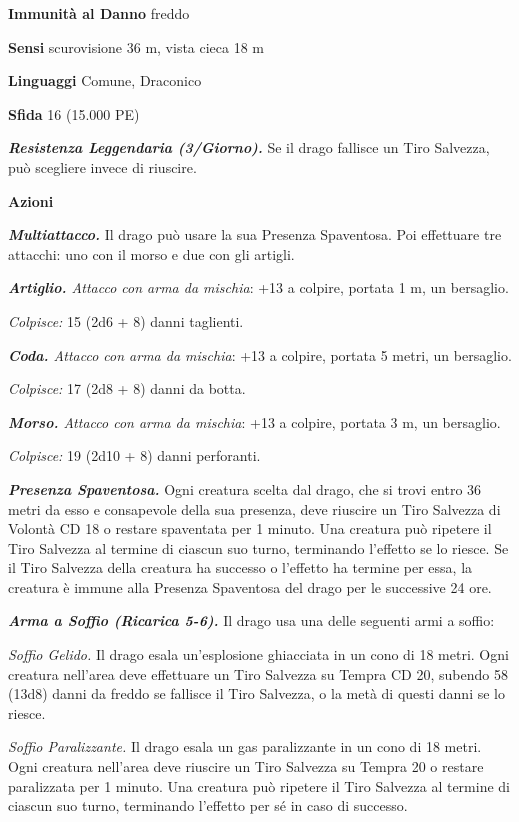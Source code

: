 \begin{multicols}{2}
\textbf{Immunità al Danno} freddo

\textbf{Sensi} scurovisione 36 m, vista cieca 18 m 

\textbf{Linguaggi} Comune, Draconico

\textbf{Sfida} 16 (15.000 PE)

\emph{\textbf{Resistenza Leggendaria (3/Giorno).}} Se il drago fallisce un Tiro Salvezza, può scegliere invece di riuscire.

\textbf{Azioni}

\emph{\textbf{Multiattacco.}} Il drago può usare la sua Presenza Spaventosa. Poi effettuare tre attacchi: uno con il morso e due con gli artigli.

\emph{\textbf{Artiglio.} Attacco con arma da mischia}: +13 a colpire, portata 1 m, un bersaglio.

\emph{Colpisce:} 15 (2d6 + 8) danni taglienti.

\emph{\textbf{Coda.} Attacco con arma da mischia}: +13 a colpire, portata 5 metri, un bersaglio.

\emph{Colpisce:} 17 (2d8 + 8) danni da botta.

\emph{\textbf{Morso.} Attacco con arma da mischia}: +13 a colpire, portata 3 m, un bersaglio.

\emph{Colpisce:} 19 (2d10 + 8) danni perforanti.

\emph{\textbf{Presenza Spaventosa.}} Ogni creatura scelta dal drago, che si trovi entro 36 metri da esso e consapevole della sua presenza, deve riuscire un Tiro Salvezza di Volontà CD 18 o restare spaventata per 1 minuto. Una creatura può ripetere il Tiro Salvezza al termine di ciascun suo turno, terminando l'effetto se lo riesce. Se il Tiro Salvezza della creatura ha successo o l'effetto ha termine per essa, la creatura è immune alla Presenza Spaventosa del drago per le successive 24 ore.

\emph{\textbf{Arma a Soffio (Ricarica 5-6).}} Il drago usa una delle seguenti armi a soffio:

\emph{Soffio Gelido.} Il drago esala un'esplosione ghiacciata in un cono di 18 metri. Ogni creatura nell'area deve effettuare un Tiro Salvezza su Tempra CD 20, subendo 58 (13d8) danni da freddo se fallisce il Tiro Salvezza, o la metà di questi danni se lo riesce.

\emph{Soffio Paralizzante.} Il drago esala un gas paralizzante in un cono di 18 metri. Ogni creatura nell'area deve riuscire un Tiro Salvezza su Tempra 20 o restare paralizzata per 1 minuto. Una creatura può ripetere il Tiro Salvezza al termine di ciascun suo turno, terminando l'effetto per sé in caso di successo.


\end{multicols}
